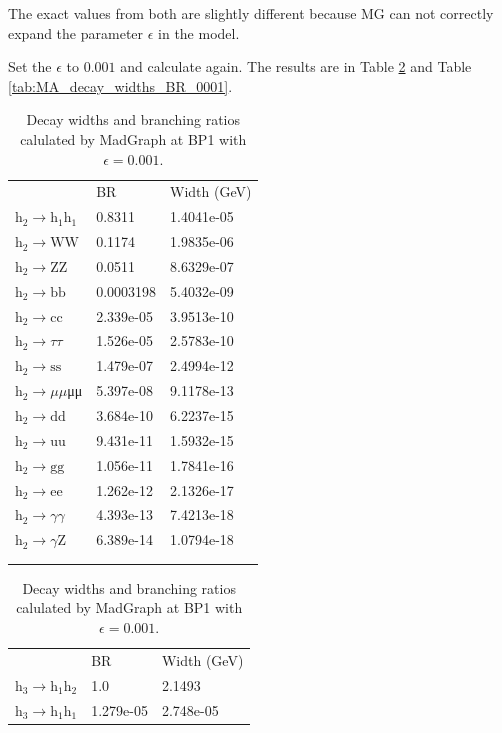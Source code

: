 \documentclass[12pt]{article}
\begin{document}
	The exact values from both are slightly different because MG can not correctly expand the parameter $\epsilon$ in the model.

	Set the $\epsilon$ to $0.001$ and calculate again. The results are in Table \ref{tab:MG_decay_widths_BR_0001} and Table \ref{tab:MA_decay_widths_BR_0001}.

	\begin{table}[htpb]
		\centering
		\caption{Decay widths and branching ratios calulated by MadGraph at BP1 with $\epsilon=0.001$.}
		\label{tab:MG_decay_widths_BR_0001}
		\begin{tabular}{lll}
								  & BR        & Width (GeV) \\
			$\text{h}_2\to\text{h}_1\text{h}_1$ & 0.8311    & 1.4041e-05  \\
			$\text{h}_2\to\text{WW}$   & 0.1174    & 1.9835e-06  \\
			$\text{h}_2\to\text{ZZ}$   & 0.0511    & 8.6329e-07  \\
			$\text{h}_2\to\text{bb}$   & 0.0003198 & 5.4032e-09  \\
			$\text{h}_2\to\text{cc}$   & 2.339e-05 & 3.9513e-10  \\
			$\text{h}_2\to\tau\tau$   & 1.526e-05 & 2.5783e-10  \\
			$\text{h}_2\to\text{ss}$   & 1.479e-07 & 2.4994e-12  \\
			$\text{h}_2\to\mu\mu$μμ   & 5.397e-08 & 9.1178e-13  \\
			$\text{h}_2\to\text{dd}$   & 3.684e-10 & 6.2237e-15  \\
			$\text{h}_2\to\text{uu}$   & 9.431e-11 & 1.5932e-15  \\
			$\text{h}_2\to\text{gg}$   & 1.056e-11 & 1.7841e-16  \\
			$\text{h}_2\to\text{ee}$   & 1.262e-12 & 2.1326e-17  \\
			$\text{h}_2\to\gamma\gamma$   & 4.393e-13 & 7.4213e-18  \\
			$\text{h}_2\to\gamma\text{Z}$   & 6.389e-14 & 1.0794e-18 \\
			\\
			\\
		\end{tabular}
		\begin{tabular}{lll}
								  & BR        & Width (GeV) \\
			$\text{h}_3\to\text{h}_1\text{h}_2$ & 1.0       & 2.1493      \\
			$\text{h}_3\to\text{h}_1\text{h}_1$ & 1.279e-05 & 2.748e-05   \\

\end{tabular}
\end{table}
\end{document}
